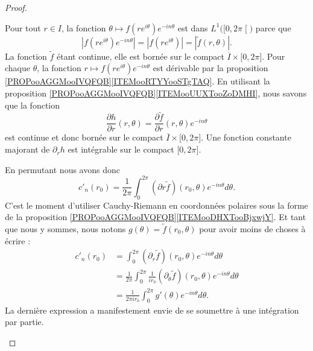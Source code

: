 \begin{proof}
\begin{subproof}
\begin{subproof}
				Pour tout \( r\in I\), la fonction \( \theta\mapsto f(r e^{i\theta}) e^{-in\theta}\) est dans \( L^1\big( \mathopen[ 0 , 2\pi \mathclose[ \big)\) parce que
				\begin{equation}
					| f(r e^{i\theta}) e^{-in\theta} |=| f(r e^{i\theta}) |=| \tilde f(r,\theta) |.
				\end{equation}
				La fonction \( \tilde f\) étant continue, elle est bornée sur le compact \( \overline{ I }\times \mathopen[ 0 , 2\pi \mathclose]\).
				Pour chaque \( \theta\), la fonction \( r\mapsto f(r e^{i\theta}) e^{-in\theta}\) est dérivable par la proposition \ref{PROPooAGGMooIVQFQB}\ref{ITEMooRTYYooSTgTAQ}.
				En utilisant la proposition \ref{PROPooAGGMooIVQFQB}\ref{ITEMooUUXTooZoDMHI}, nous savons que la fonction
				\begin{equation}
					\frac{ \partial h }{ \partial r  }(r,\theta)=\frac{ \partial \tilde f }{ \partial r }(r,\theta) e^{-in\theta}
				\end{equation}
				est continue et donc bornée sur le compact \( \overline{ I }\times \mathopen[ 0 , 2\pi \mathclose]\). Une fonction constante majorant de \( \partial_rh\) est intégrable sur le compact \( \mathopen[ 0 , 2\pi \mathclose]\).
			\end{subproof}
			En permutant nous avons donc
			\begin{equation}
				c'_n(r_0)=\frac{1}{ 2\pi }\int_0^{2\pi}(\partial r\tilde f)(r_0,\theta) e^{-in\theta}d\theta.
			\end{equation}
			C'est le moment d'utiliser Cauchy-Riemann en coordonnées polaires sous la forme de la proposition \ref{PROPooAGGMooIVQFQB}\ref{ITEMooDHXTooBjxwjY}. Et tant que nous y sommes, nous notons \( g(\theta)=\tilde f(r_0,\theta)\) pour avoir moins de choses à écrire :
			\begin{subequations}
				\begin{align}
					c'_n(r_0) & =\int_0^{2\pi}(\partial_r\tilde f)(r_0,\theta) e^{-in\theta}d\theta                                        \\
					          & =\frac{1}{ 2\pi }\int_0^{2\pi}\frac{1}{ ir_0 }(\partial_{\theta}\tilde f)(r_0,\theta) e^{-in\theta}d\theta \\
					          & =\frac{1}{ 2\pi ir_0 }\int_{0}^{2\pi}g'(\theta) e^{-in\theta}d\theta.
				\end{align}
			\end{subequations}
			La dernière expression a manifestement envie de se soumettre à une intégration par partie.

\end{subproof}
\end{proof}
